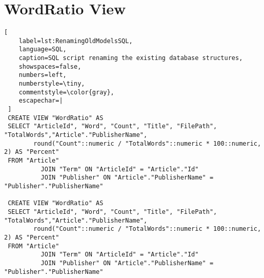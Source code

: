 \chapter{WordRatio View}\label{Appendix_WordRatioOld}
\begin{lstlisting}[
    label=lst:RenamingOldModelsSQL,
    language=SQL,
    caption=SQL script renaming the existing database structures,
    showspaces=false,
    numbers=left,
    numberstyle=\tiny,
    commentstyle=\color{gray},
    escapechar=|
 ]
 CREATE VIEW "WordRatio" AS
 SELECT "ArticleId", "Word", "Count", "Title", "FilePath", "TotalWords","Article"."PublisherName",
        round("Count"::numeric / "TotalWords"::numeric * 100::numeric, 2) AS "Percent"
 FROM "Article"
          JOIN "Term" ON "ArticleId" = "Article"."Id"
          JOIN "Publisher" ON "Article"."PublisherName" = "Publisher"."PublisherName"
 
 CREATE VIEW "WordRatio" AS
 SELECT "ArticleId", "Word", "Count", "Title", "FilePath", "TotalWords","Article"."PublisherName",
        round("Count"::numeric / "TotalWords"::numeric * 100::numeric, 2) AS "Percent"
 FROM "Article"
          JOIN "Term" ON "ArticleId" = "Article"."Id"
          JOIN "Publisher" ON "Article"."PublisherName" = "Publisher"."PublisherName"
\end{lstlisting}


